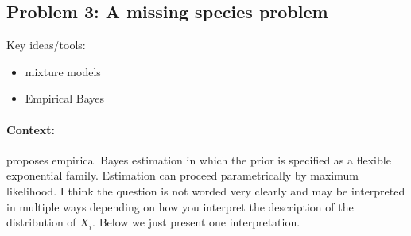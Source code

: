 \subsection*{Problem 3: A missing species problem}
Key ideas/tools:
\begin{itemize}
\item mixture models
\item Empirical Bayes
\end{itemize}

\paragraph{Context:} \citet{efron2016empirical} proposes empirical Bayes estimation in which the prior is specified as a flexible exponential family. Estimation can proceed parametrically by maximum likelihood. I think the question is not worded very clearly and may be interpreted in multiple ways depending on how you interpret the description of the distribution of $X_i$. Below we just present one interpretation.

